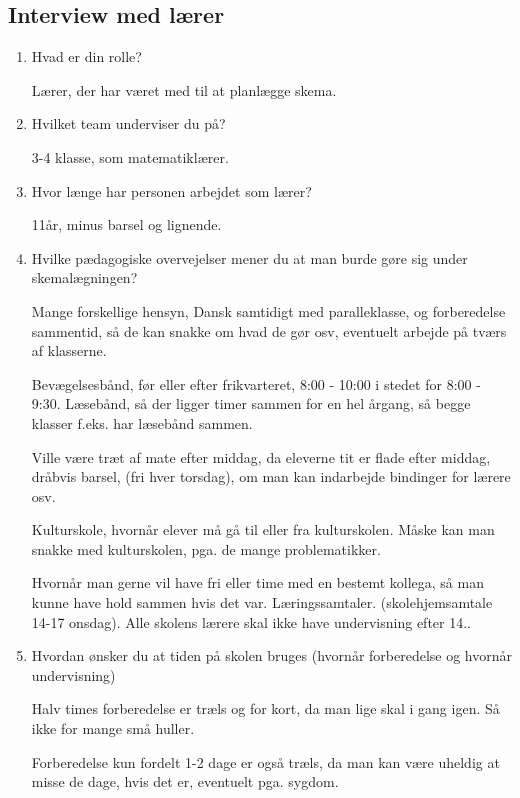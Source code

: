 \subsection{Interview med lærer}
\label{InterviewLaerer}
\begin{enumerate}
	\item Hvad er din rolle?
    
    Lærer, der har været med til at planlægge skema.
   
   
    \item Hvilket team underviser du på?
	    
	3-4 klasse, som matematiklærer.
    
    
    \item Hvor længe har personen arbejdet som lærer?
	    
	11år, minus barsel og lignende.
    
    
    \item Hvilke pædagogiske overvejelser mener du at man burde gøre sig under skemalægningen?
		
	Mange forskellige hensyn, Dansk samtidigt med paralleklasse, og forberedelse sammentid, så de kan snakke om hvad de gør osv, eventuelt arbejde på tværs af klasserne.
	
	Bevægelsesbånd, før eller efter frikvarteret, 8:00 - 10:00 i stedet for 8:00 - 9:30. Læsebånd, så der ligger timer sammen for en hel årgang, så begge klasser f.eks. har læsebånd sammen.
	
	Ville være træt af mate efter middag, da eleverne tit er flade efter middag, dråbvis barsel, (fri hver torsdag), om man kan indarbejde bindinger for lærere osv. 
		
	Kulturskole, hvornår elever må gå til eller fra kulturskolen. Måske kan man snakke med kulturskolen, pga. de mange problematikker.
	
	Hvornår man gerne vil have fri eller time med en bestemt kollega, så man kunne have hold sammen hvis det var. Læringssamtaler. (skolehjemsamtale 14-17 onsdag). Alle skolens lærere skal ikke have undervisning efter 14.. 
		
    
    \item Hvordan ønsker du at tiden på skolen bruges (hvornår forberedelse og hvornår undervisning)
    
    Halv times forberedelse er træls og for kort, da man lige skal i gang igen. Så ikke for mange små huller. 
	
	Forberedelse kun fordelt 1-2 dage er også træls, da man kan være uheldig at misse de dage, hvis det er, eventuelt pga. sygdom.
	

\end{enumerate}

